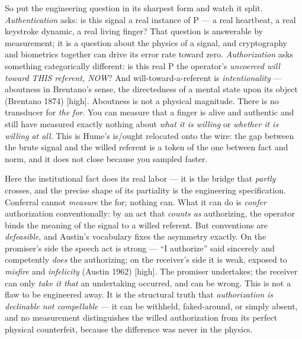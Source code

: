 \documentclass[11pt]{article}
\begin{document}
So put the engineering question in its sharpest form and watch it split. \emph{Authentication} asks: is this signal a real instance of P — a real heartbeat, a real keystroke dynamic, a real living finger? That question is answerable by measurement; it is a question about the physics of a signal, and cryptography and biometrics together can drive its error rate toward zero. \emph{Authorization} asks something categorically different: is this real P the operator's \emph{uncoerced will toward THIS referent, NOW}? And will-toward-a-referent is \emph{intentionality} — aboutness in Brentano's sense, the directedness of a mental state upon its object (Brentano 1874) [high]. Aboutness is not a physical magnitude. There is no transducer for \emph{the for}. You can measure that a finger is alive and authentic and still have measured exactly nothing about \emph{what it is willing} or \emph{whether it is willing at all}. This is Hume's is/\allowbreak{}ought relocated onto the wire: the gap between the brute signal and the willed referent is a token of the one between fact and norm, and it does not close because you sampled faster.

Here the institutional fact does its real labor — it is the bridge that \emph{partly} crosses, and the precise shape of its partiality is the engineering specification. Conferral cannot \emph{measure} the for; nothing can. What it can do is \emph{confer} authorization conventionally: by an act that \emph{counts as} authorizing, the operator binds the meaning of the signal to a willed referent. But conventions are \emph{defeasible}, and Austin's vocabulary fixes the asymmetry exactly. On the promiser's side the speech act is strong — ``I authorize'' said sincerely and competently \emph{does} the authorizing; on the receiver's side it is weak, exposed to \emph{misfire} and \emph{infelicity} (Austin 1962) [high]. The promiser undertakes; the receiver can only \emph{take it that} an undertaking occurred, and can be wrong. This is not a flaw to be engineered away. It is the structural truth that \emph{authorization is declinable not compellable} — it can be withheld, faked-around, or simply absent, and no measurement distinguishes the willed authorization from its perfect physical counterfeit, because the difference was never in the physics.
\end{document}
